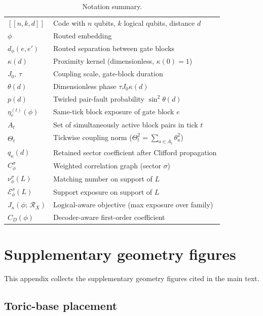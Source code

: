 \documentclass[
aps,
prx,
10pt,
twocolumn,
groupedaddress,
longbibliography,
nofootinbib,
floatfix
]{revtex4-2}
\theoremstyle{definition}
\newcommand{\Ew}{\mathcal{E}}
\newcommand{\RX}{\mathcal{R}_X}
\newcommand{\bb}[1]{\ensuremath{\left[\!\left[#1\right]\!\right]}}
\begin{document}
\begin{table}[!htbp]
\caption{Notation summary.}\label{tab:notation}
\footnotesize
\renewcommand{\arraystretch}{1.2}%
\begin{ruledtabular}
\begin{tabular}{ll}
$\bb{n,k,d}$ & Code with $n$ qubits, $k$ logical qubits, distance $d$ \\
$\phi$ & Routed embedding \\
$d_\phi(e,e')$ & Routed separation between gate blocks \\
$\kappa(d)$ & Proximity kernel (dimensionless, $\kappa(0)=1$) \\
$J_0,\,\tau$ & Coupling scale, gate-block duration \\
$\theta(d)$ & Dimensionless phase $\tau J_0\kappa(d)$ \\
$p(d)$ & Twirled pair-fault probability $\sin^2\theta(d)$ \\
$\eta_e^{(t)}(\phi)$ & Same-tick block exposure of gate block $e$ \\
$A_t$ & Set of simultaneously active block pairs in tick $t$ \\
$\Theta_t$ & Tickwise coupling norm ($\Theta_t^2=\sum_{a\in A_t}\theta_a^2$) \\
$q_\kappa(d)$ & Retained sector coefficient after Clifford propagation \\
$C_\phi^\sigma$ & Weighted correlation graph (sector $\sigma$) \\
$\nu_\phi^\sigma(L)$ & Matching number on support of $L$ \\
$\Ew_\phi^\sigma(L)$ & Support exposure on support of $L$ \\
$J_\kappa(\phi;\,\RX)$ & Logical-aware objective (max exposure over family) \\
$C_D(\phi)$ & Decoder-aware first-order coefficient \\
\end{tabular}
\end{ruledtabular}
\end{table}

\section{Supplementary geometry figures}
\label{app:geometry}

This appendix collects the supplementary geometry figures cited in the main text.

\subsection{Toric-base placement}
\end{document}
